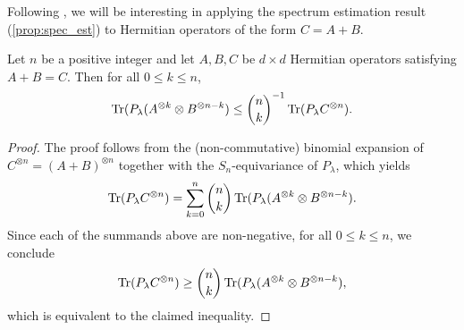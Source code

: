 \documentclass[notitlepage, 10pt]{article}
\begin{document}
Following \cite{christandl2008quantum}, we will be interesting in applying the spectrum estimation result (\cref{prop:spec_est}) to Hermitian operators of the form $C = A + B$. 
\begin{lem}
    \label{lem:binomial_expansion}
    Let $n$ be a positive integer and let $A,B,C$ be $d\times d$ Hermitian operators satisfying $A+B=C$.
    Then for all $0 \leq k \leq n$,
    \begin{equation}
        \operatorname{Tr}(P_{\lambda} (A^{\otimes k} \otimes B^{\otimes n-k}) \leq \binom{n}{k}^{-1} \operatorname{Tr}(P_{\lambda} C^{\otimes n}).
    \end{equation}
\end{lem}
\begin{proof}
    The proof follows from the (non-commutative) binomial expansion of $C^{\otimes n} = (A+B)^{\otimes n}$ together with the $S_n$-equivariance of $P_{\lambda}$, which yields
    \begin{equation}
        \operatorname{Tr}(P_{\lambda} C^{\otimes n}) = \sum_{k=0}^{n} \binom{n}{k} \operatorname{Tr}(P_{\lambda} (A^{\otimes k} \otimes B^{\otimes n-k}).
    \end{equation}
    Since each of the summands above are non-negative, for all $0 \leq k \leq n$, we conclude
    \begin{equation}
        \operatorname{Tr}(P_{\lambda} C^{\otimes n}) \geq \binom{n}{k} \operatorname{Tr}(P_{\lambda} (A^{\otimes k} \otimes B^{\otimes n-k}),
    \end{equation}
    which is equivalent to the claimed inequality.
\end{proof}
\end{document}
